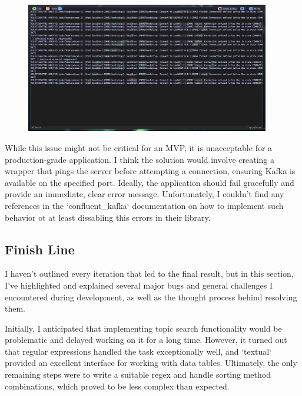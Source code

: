 \documentclass[10pt , a4paper]{report}
\begin{document}
\newpage
\begin{figure}[htbp]
  \begin{center}
    \includegraphics[width=0.95\textwidth]{imgs/BrokerConnectionError.png}
  \end{center}
  \caption{}\label{fig:}
\end{figure}

While this issue might not be critical for an MVP, it is unacceptable for a production-grade application. I think the solution would involve creating a wrapper that pings the server before attempting a connection, ensuring Kafka is available on the specified port. Ideally, the application should fail gracefully and provide an immediate, clear error message. Unfortunately, I couldn’t find any references in the `confluent\_kafka` documentation on how to implement such behavior ot at least dissabling this errors in their library.

\subsection{Finish Line}

I haven’t outlined every iteration that led to the final result, but in this section, I’ve highlighted and explained several major bugs and general challenges I encountered during development, as well as the thought process behind resolving them.

Initially, I anticipated that implementing topic search functionality would be problematic and delayed working on it for a long time. However, it turned out that regular expressions handled the task exceptionally well, and `textual` provided an excellent interface for working with data tables. Ultimately, the only remaining steps were to write a suitable regex and handle sorting method combinations, which proved to be less complex than expected.
\end{document}
